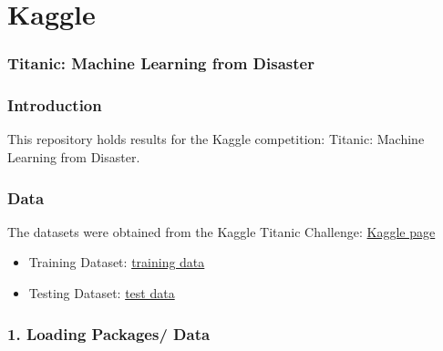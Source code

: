 \documentclass[]{article}
\title{}
\author{}
\date{}
\begin{document}
\maketitle


\section{Kaggle}\label{kaggle}

\subsubsection{Titanic: Machine Learning from
Disaster}\label{titanic-machine-learning-from-disaster}

\subsubsection{Introduction}\label{introduction}

This repository holds results for the Kaggle competition: Titanic:
Machine Learning from Disaster.

\subsubsection{Data}\label{data}

The datasets were obtained from the Kaggle Titanic Challenge:
\href{https://www.kaggle.com/c/titanic}{Kaggle page}

\begin{itemize}
\itemsep1pt\parskip0pt
\item
  Training Dataset:
  \href{https://www.kaggle.com/c/titanic-gettingStarted/download/train.csv}{training
  data}
\item
  Testing Dataset:
  \href{https://www.kaggle.com/c/titanic-gettingStarted/download/test.csv}{test
  data}
\end{itemize}

\subsubsection{1. Loading Packages/ Data}\label{loading-packages-data}
\end{document}
